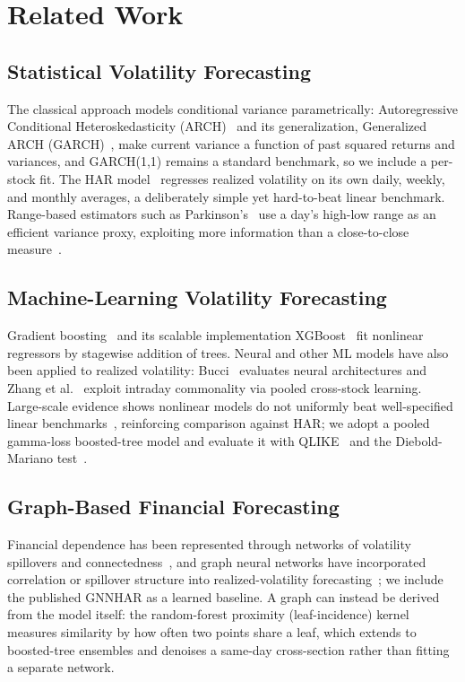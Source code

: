 \documentclass[runningheads,a4paper]{llncs}
\begin{document}
\section{Related Work}

\subsection{Statistical Volatility Forecasting}
The classical approach models conditional variance parametrically: Autoregressive Conditional Heteroskedasticity (ARCH)~\cite{engle1982} and its
generalization, Generalized ARCH (GARCH)~\cite{bollerslev1986}, make current variance a function of past squared returns and
variances, and GARCH(1,1) remains a standard benchmark, so we include a per-stock fit. The HAR
model~\cite{corsi2009} regresses realized volatility on its own daily, weekly, and monthly averages, a
deliberately simple yet hard-to-beat linear benchmark. Range-based estimators such as
Parkinson's~\cite{parkinson1980} use a day's high-low range as an efficient variance proxy, exploiting
more information than a close-to-close measure~\cite{alizadeh2002}.

\subsection{Machine-Learning Volatility Forecasting}
Gradient boosting~\cite{friedman2001} and its scalable implementation XGBoost~\cite{chen2016} fit
nonlinear regressors by stagewise addition of trees. Neural and other ML models have also been applied to
realized volatility: Bucci~\cite{bucci2020} evaluates neural architectures and Zhang et
al.~\cite{zhang2024ml} exploit intraday commonality via pooled cross-stock learning. Large-scale evidence
shows nonlinear models do not uniformly beat well-specified linear benchmarks~\cite{branco2024},
reinforcing comparison against HAR; we adopt a pooled gamma-loss boosted-tree model and evaluate it with
QLIKE~\cite{patton2011} and the Diebold-Mariano test~\cite{dm1995}.

\subsection{Graph-Based Financial Forecasting}
Financial dependence has been represented through networks of volatility spillovers and connectedness~\cite{diebold2014},
and graph neural networks have incorporated correlation or spillover structure into realized-volatility
forecasting~\cite{gnnhar2024}; we include the published GNNHAR as a learned baseline. A graph can instead
be derived from the model itself: the random-forest proximity (leaf-incidence) kernel~\cite{rhodes2023}
measures similarity by how often two points share a leaf, which extends to boosted-tree ensembles and
denoises a same-day cross-section rather than fitting a separate network.
\end{document}
